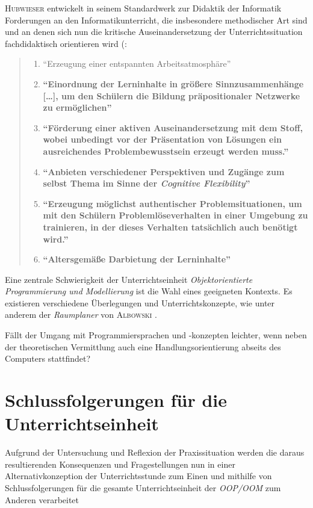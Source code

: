 \documentclass[paper=a4, DIV=13, BCOR=12mm, twoside=on, onecolumn=on, open = any, titlepage =on, parskip =half-, headsepline = on, footsepline = on, chapterprefix = on, sectionprefix = on, appendixprefix = off, fontsize = 11pt, numbers = noenddot, abstract = off]{scrreprt}
\begin{document}
\textsc{Hubwieser} entwickelt in seinem Standardwerk zur Didaktik der Informatik Forderungen an den Informatikunterricht, die insbesondere methodischer Art sind und an denen sich nun die kritische Auseinandersetzung der Unterrichtssituation fachdidaktisch orientieren wird (\cite[S.67]{hubwieser:07}:
\begin{quote}
\singlespacing
\begin{enumerate}
\item "`Erzeugung einer entspannten Arbeitsatmosphäre"'
\item\textbf{ "`Einordnung der Lerninhalte in größere Sinnzusammenhänge […], um den Schülern die Bildung präpositionaler Netzwerke zu ermöglichen"'}
\item \textbf{"`Förderung einer aktiven Auseinandersetzung mit dem Stoff, wobei unbedingt vor der Präsentation von Lösungen ein ausreichendes Problembewusstsein erzeugt werden muss."'}
\item \textbf{"`Anbieten verschiedener Perspektiven und Zugänge zum selbst Thema im Sinne der \emph{Cognitive Flexibility}"'}
\item \textbf{ "`Erzeugung möglichst authentischer Problemsituationen, um mit den Schülern Problemlöseverhalten in einer Umgebung zu trainieren, in der dieses Verhalten tatsächlich auch benötigt wird."'}
\item \textbf{"`Altersgemäße Darbietung der Lerninhalte"'}
\end{enumerate}
\end{quote}


\onehalfspacing

Eine zentrale Schwierigkeit der Unterrichtseinheit \emph{Objektorientierte Programmierung und Modellierung} ist die Wahl eines geeigneten Kontexts. Es existieren verschiedene Überlegungen und Unterrichtskonzepte, wie unter anderem der \emph{Raumplaner} von \textsc{Albowski} \cite{albowski}. 

Fällt der Umgang mit Programmiersprachen und -konzepten leichter, wenn neben der theoretischen Vermittlung auch eine Handlungsorientierung abseits des Computers stattfindet?

\par \singlespacing
\chapter{Schlussfolgerungen für die Unterrichtseinheit}
\label{schlussfolgerungen}
\onehalfspacing

Aufgrund der Untersuchung und Reflexion der Praxissituation werden die daraus resultierenden Konsequenzen und Fragestellungen nun in einer Alternativkonzeption der Unterrichtsstunde zum Einen und mithilfe von Schlussfolgerungen für die gesamte Unterrichtseinheit der \emph{OOP/OOM} zum Anderen verarbeitet 
\end{document}
